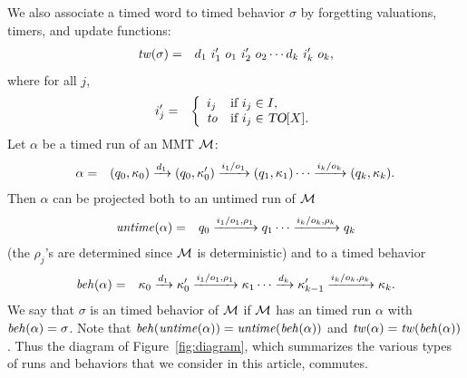 We also associate a timed word to timed behavior $\sigma$ by forgetting valuations, timers, and update functions:
\begin{eqnarray*}
\mathit{tw}(\sigma) & = & d_ 1 ~ i'_1 ~ o_1 ~ i'_2 ~ o_2 \cdots d_k ~ i'_k ~ o_k, 
\end{eqnarray*} 
where for all  $j$,
\begin{eqnarray*}
i'_j  & = &  \left\{ \begin{array}{ll}
i_j & \mbox{if } i_j \in I,\\
\mathit{to} & \mbox{if } i_j \in \mbox{\sl TO}[X].
\end{array} \right.
\end{eqnarray*}
Let $\alpha$ be a timed run of an MMT ${\mathcal M}$: 
\begin{eqnarray*}
\alpha & = & (q_0, \kappa_0) \xrightarrow{d_1} (q_0, \kappa'_0) \xrightarrow{i_1/o_1} (q_1, \kappa_1)  \cdots
 \xrightarrow{i_k/o_k} (q_k, \kappa_k).
\end{eqnarray*}
Then $\alpha$ can be projected both to an untimed run of ${\mathcal M}$
\begin{eqnarray*}
\mathit{untime} (\alpha) & = & q_0 \xrightarrow{i_1/o_1, \rho_1} q_1  \cdots \xrightarrow{i_k/o_k, \rho_k} q_k
\end{eqnarray*}
(the $\rho_j$'s are determined since ${\mathcal M}$ is deterministic) and to a timed behavior
\begin{eqnarray*}
\mathit{beh}(\alpha) & = & \kappa_0 \xrightarrow{d_1} \kappa'_0 \xrightarrow{i_1/o_1, \rho_1} \kappa_1  \cdots
\xrightarrow{d_k} \kappa'_{k-1} \xrightarrow{i_k/o_k, \rho_k} \kappa_{k}.
\end{eqnarray*}
\iflong
We say that $\sigma$ is an timed behavior of ${\mathcal M}$ if ${\mathcal M}$ has an timed run $\alpha$ with $\mathit{beh}(\alpha) = \sigma$.
\fi
Note that $\mathit{beh}(\mathit{untime}(\alpha))=\mathit{untime}(\mathit{beh}(\alpha))$ and $\mathit{tw}(\alpha) = \mathit{tw}(\mathit{beh}(\alpha))$.
\iflong
Thus the diagram of Figure~\ref{fig:diagram}, which summarizes the various types of runs and behaviors that we consider
in this article, commutes.
